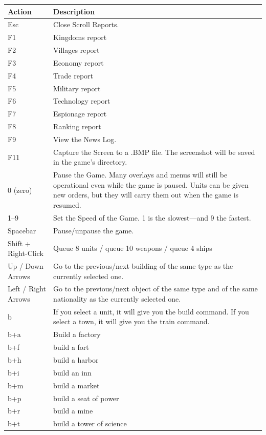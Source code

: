 \begin{center}
	\begin{tabular}{|p{1in}|p{3in}|}
		\hline	 
		Action	& Description \\ \hline
		Esc	& Close Scroll Reports. \\ \hline
		F1	& Kingdoms report \\ \hline
		F2	& Villages report \\ \hline
		F3	& Economy report \\ \hline
		F4	& Trade report \\ \hline
		F5	& Military report \\ \hline
		F6	& Technology report \\ \hline
		F7	& Espionage report \\ \hline
		F8	& Ranking report \\ \hline
		F9	& View the News Log. \\ \hline
		F11	& Capture the Screen to a .BMP file. The screenshot will be saved in the game’s directory. \\ \hline
		0 (zero) & Pause the Game. Many overlays and menus will still be operational even while the game is paused. Units can be given new orders, but they will carry them out when the game is resumed. \\ \hline
		1--9 & Set the Speed of the Game. 1 is the slowest---and 9 the fastest. \\ \hline
		Spacebar & Pause/unpause the game. \\ \hline
		Shift + Right-Click	& Queue 8 units / queue 10 weapons / queue 4 ships \\ \hline
		Up / Down Arrows & Go to the previous/next building of the same type as the currently selected one. \\ \hline
		Left / Right Arrows	& Go to the previous/next object of the same type and of the same nationality as the currently selected one. \\ \hline
		b & If you select a unit, it will give you the build command. If you select a town, it will give you the train command. \\ \hline
		b+a	& Build a factory \\ \hline
		b+f	& build a fort \\ \hline
		b+h	& build a harbor \\ \hline
		b+i	& build an inn \\ \hline
		b+m	& build a market \\ \hline
		b+p	& build a seat of power \\ \hline
		b+r	& build a mine \\ \hline
		b+t	& build a tower of science \\ \hline
	\end{tabular}
\end{center}

